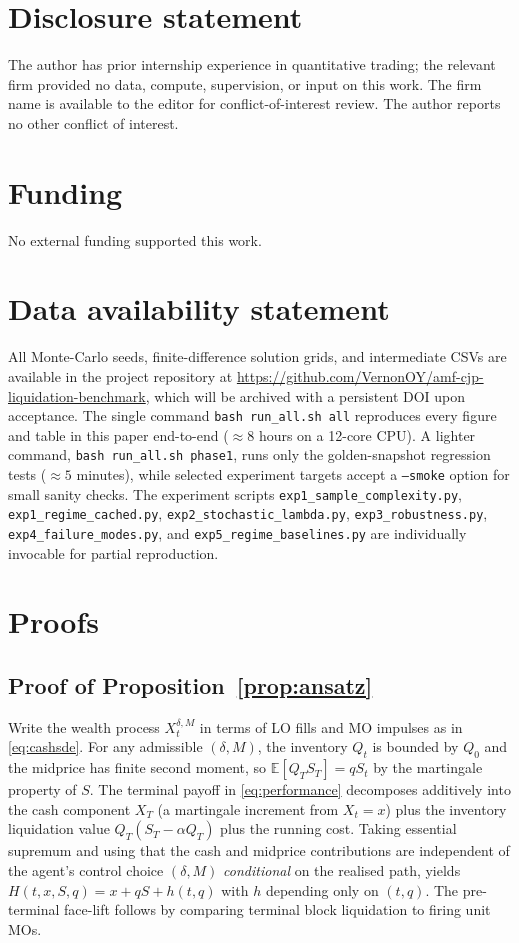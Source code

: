 \documentclass[]{interact}
\theoremstyle{plain}
\theoremstyle{definition}
\theoremstyle{remark}
\newcommand{\E}{\mathbb{E}}
\newcommand{\1}[1]{\mathbf{1}_{\{#1\}}}
\begin{document}
\section*{Disclosure statement}
The author has prior internship experience in quantitative trading; the relevant firm provided no data, compute, supervision, or input on this work. The firm name is available to the editor for conflict-of-interest review. The author reports no other conflict of interest.

\section*{Funding}
No external funding supported this work.

\section*{Data availability statement}
All Monte-Carlo seeds, finite-difference solution grids, and intermediate CSVs are available in the project repository at \url{https://github.com/VernonOY/amf-cjp-liquidation-benchmark}, which will be archived with a persistent DOI upon acceptance. The single command \texttt{bash run\_all.sh all} reproduces every figure and table in this paper end-to-end ($\approx 8$ hours on a 12-core CPU). A lighter command, \texttt{bash run\_all.sh phase1}, runs only the golden-snapshot regression tests ($\approx 5$ minutes), while selected experiment targets accept a \texttt{--smoke} option for small sanity checks. The experiment scripts \texttt{exp1\_sample\_complexity.py}, \texttt{exp1\_regime\_cached.py}, \texttt{exp2\_stochastic\_lambda.py}, \texttt{exp3\_robustness.py}, \texttt{exp4\_failure\_modes.py}, and \texttt{exp5\_regime\_baselines.py} are individually invocable for partial reproduction.

\appendix

\section{Proofs}\label{app:proofs}

\subsection{Proof of Proposition~\ref{prop:ansatz}}
Write the wealth process $X^{\delta,M}_t$ in terms of LO fills and MO impulses as in \eqref{eq:cashsde}. For any admissible $(\delta, M)$, the inventory $Q_t$ is bounded by $Q_0$ and the midprice has finite second moment, so $\E[Q_T S_T] = q S_t$ by the martingale property of $S$. The terminal payoff in \eqref{eq:performance} decomposes additively into the cash component $X_T$ (a martingale increment from $X_t = x$) plus the inventory liquidation value $Q_T (S_T - \alpha Q_T)$ plus the running cost. Taking essential supremum and using that the cash and midprice contributions are independent of the agent's control choice $(\delta, M)$ \emph{conditional} on the realised path, yields $H(t,x,S,q) = x + qS + h(t,q)$ with $h$ depending only on $(t, q)$. The pre-terminal face-lift follows by comparing terminal block liquidation to firing unit MOs.
\end{document}
